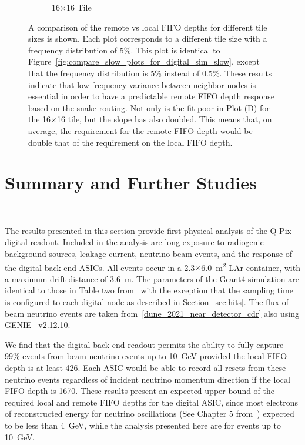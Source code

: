 \begin{figure}
\begin{subfigure}[b]{0.475\textwidth}
      \caption[]%
      {\small 16$\times$16 Tile}    
  \end{subfigure}
  \caption[]
  {\small A comparison of the remote vs local FIFO depths for different tile sizes is shown.
  Each plot corresponds to a different tile size with a frequency distribution of 5\%.
  This plot is identical to Figure~\ref{fig:compare_slow_plots_for_digital_sim_slow}, except that the frequency distribution is 5\% instead of 0.5\%.
  These results indicate that low frequency variance between neighbor nodes is essential in order to have a predictable remote FIFO depth response based on the snake routing.
  Not only is the fit poor in Plot-(D) for the 16$\times$16 tile, but the slope has also doubled.
  This means that, on average, the requirement for the remote FIFO depth would be double that of the requirement on the local FIFO depth.
} 
  \label{fig:compare_fast_plots_for_digital_sim_fast}
\end{figure}







\section{Summary and Further Studies}~\label{sec:further_studies}

The results presented in this section provide first physical analysis of the Q-Pix digital readout.
Included in the analysis are long exposure to radiogenic background sources, leakage current, neutrino beam events, and the response of the digital back-end ASICs.
All events occur in a 2.3$\times$6.0~\unit{m^{2}} LAr container, with a maximum drift distance of 3.6~\unit{m}.
The parameters of the Geant4 simulation are identical to those in Table two from~\citep{qpix:shion} with the exception that the sampling time is configured to each digital node as described in Section~\ref{sec:hits}.
The flux of beam neutrino events are taken from~\ref{dune_2021_near_detector_cdr} also using GENIE~\citep{Andreopoulos:2009rq} v2.12.10.

We find that the digital back-end readout permits the ability to fully capture 99\% events from beam neutrino events up to 10~\unit{GeV} provided the local FIFO depth is at least 426.
Each ASIC would be able to record all resets from these neutrino events regardless of incident neutrino momentum direction if the local FIFO depth is 1670.
These results present an expected upper-bound of the required local and remote FIFO depths for the digital ASIC, since most electrons of reconstructed energy for neutrino oscillations (See Chapter 5 from~\citep{DUNE_TDRv3_Abi_2020}) expected to be less than 4~\unit{GeV}, while the analysis presented here are for events up to 10~\unit{GeV}.

